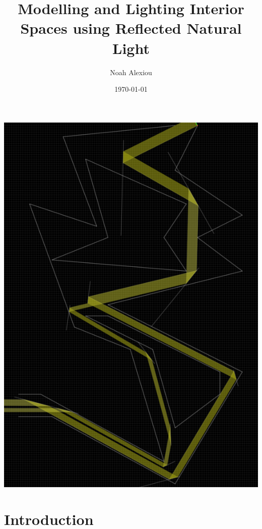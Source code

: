 \documentclass[11pt, letterpaper]{article}
\begin{document}
	\begin{titlepage}
		\title{Modelling and Lighting Interior Spaces using Reflected Natural Light}
		\author{Noah Alexiou}
		\date{\today}
		
		\maketitle
		\centering
		\includegraphics[width=14cm]{cave2.png}
		
	\end{titlepage}
	
	\newpage
	\tableofcontents
	
	
	\newpage
	
	\section{Introduction}
	
\end{document}
